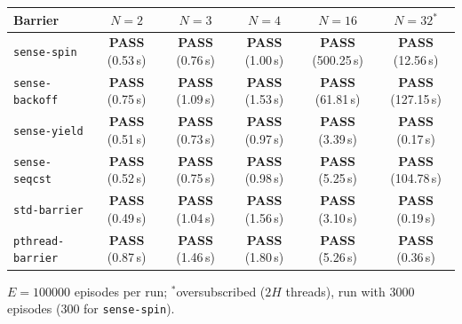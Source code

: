 \begin{tabular}{lccccc}
\toprule
\textbf{Barrier} & $N=2$ & $N=3$ & $N=4$ & $N=16$ & $N=32$$^{*}$ \\
\midrule
\texttt{sense-spin} & \textbf{PASS} (0.53\,s) & \textbf{PASS} (0.76\,s) & \textbf{PASS} (1.00\,s) & \textbf{PASS} (500.25\,s) & \textbf{PASS} (12.56\,s) \\
\texttt{sense-backoff} & \textbf{PASS} (0.75\,s) & \textbf{PASS} (1.09\,s) & \textbf{PASS} (1.53\,s) & \textbf{PASS} (61.81\,s) & \textbf{PASS} (127.15\,s) \\
\texttt{sense-yield} & \textbf{PASS} (0.51\,s) & \textbf{PASS} (0.73\,s) & \textbf{PASS} (0.97\,s) & \textbf{PASS} (3.39\,s) & \textbf{PASS} (0.17\,s) \\
\texttt{sense-seqcst} & \textbf{PASS} (0.52\,s) & \textbf{PASS} (0.75\,s) & \textbf{PASS} (0.98\,s) & \textbf{PASS} (5.25\,s) & \textbf{PASS} (104.78\,s) \\
\texttt{std-barrier} & \textbf{PASS} (0.49\,s) & \textbf{PASS} (1.04\,s) & \textbf{PASS} (1.56\,s) & \textbf{PASS} (3.10\,s) & \textbf{PASS} (0.19\,s) \\
\texttt{pthread-barrier} & \textbf{PASS} (0.87\,s) & \textbf{PASS} (1.46\,s) & \textbf{PASS} (1.80\,s) & \textbf{PASS} (5.26\,s) & \textbf{PASS} (0.36\,s) \\
\bottomrule
\end{tabular}

\vspace{2pt}\raggedright\footnotesize $E=\num{100000}$ episodes per run; $^{*}$oversubscribed ($2H$ threads), run with 3000 episodes (300 for \texttt{sense-spin}).
